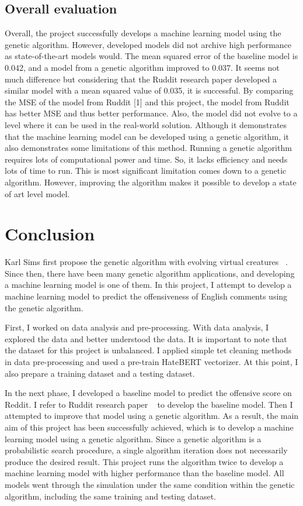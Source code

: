 \documentclass[11pt, natbib=false]{article}
\begin{document}
\subsection{Overall evaluation}
Overall, the project successfully develops a machine learning model using the genetic algorithm.
However, developed models did not archive high performance as state-of-the-art models would.
The mean squared error of the baseline model is 0.042, and a model from a genetic algorithm improved to 0.037.
It seems not much difference but considering that the Ruddit research paper developed a similar model with a mean squared value of 0.035, it is successful.
By comparing the MSE of the model from Ruddit [1] and this project, the model from Ruddit has better MSE and thus better performance.
Also, the model did not evolve to a level where it can be used in the real-world solution.
Although it demonstrates that the machine learning model can be developed using a genetic algorithm, it also demonstrates some limitations of this method.
Running a genetic algorithm requires lots of computational power and time.
So, it lacks efficiency and needs lots of time to run.
This is most significant limitation comes down to a genetic algorithm.
However, improving the algorithm makes it possible to develop a state of art level model.

\section{Conclusion}
Karl Sims first propose the genetic algorithm with evolving virtual creatures ~\cite{sims1994evolving}.
Since then, there have been many genetic algorithm applications, and developing a machine learning model is one of them.
In this project, I attempt to develop a machine learning model to predict the offensiveness of English comments using the genetic algorithm.

First, I worked on data analysis and pre-processing.
With data analysis, I explored the data and better understood the data.
It is important to note that the dataset for this project is unbalanced.
I applied simple tet cleaning methods in data pre-processing and used a pre-train HateBERT vectorizer.
At this point, I also prepare a training dataset and a testing dataset.

In the next phase, I developed a baseline model to predict the offensive score on Reddit.
I refer to Ruddit research paper ~\cite{hada2021ruddit} to develop the baseline model.
Then I attempted to improve that model using a genetic algorithm.
As a result, the main aim of this project has been successfully achieved, which is to develop a machine learning model using a genetic algorithm.
Since a genetic algorithm is a probabilistic search procedure, a single algorithm iteration does not necessarily produce the desired result.
This project runs the algorithm twice to develop a machine learning model with higher performance than the baseline model.
All models went through the simulation under the same condition within the genetic algorithm, including the same training and testing dataset.
\end{document}
